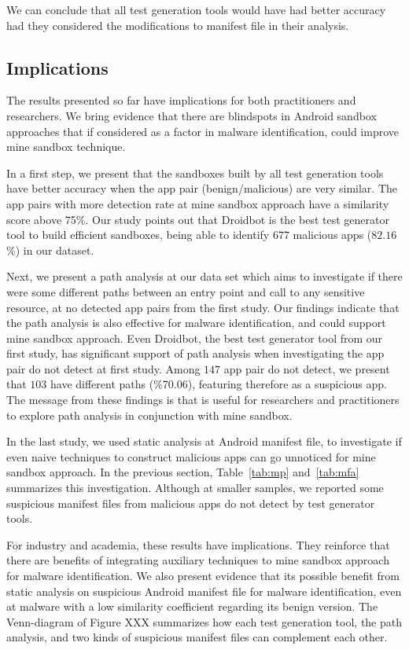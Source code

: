 \begin{obs}{3}{}
 We can conclude that all test generation tools  would have had better accuracy had they considered the modifications to manifest file in their analysis. 
\end{obs}

\subsection{Implications}\label{sec:implications}

The results presented so far have implications for both practitioners and researchers. We bring evidence that there are blindspots in Android sandbox approaches that if considered as a factor in malware identification, could improve mine sandbox technique. 

In a first step, we present that the sandboxes built by all test generation tools have better accuracy when the app pair (benign/malicious) are very similar. The app pairs with more detection rate at mine sandbox approach have a similarity score above 75\%. Our study points out that Droidbot is the best test generator tool to build efficient sandboxes, being able to identify $677$ malicious apps ($82.16$\%) in our dataset.

Next, we present a path analysis at our data set which aims to investigate if there were some different paths between an entry point and call to any sensitive resource, at no detected app pairs from the first study. Our findings indicate that the path analysis is also effective for malware identification, and could support mine sandbox approach. Even Droidbot, the best test generator tool from our first study, has significant support of path analysis when investigating the app pair do not detect at first study. Among $147$ app pair do not detect, we present that $103$ have different paths (\%70.06), featuring therefore as a suspicious app. The message from these findings is that is useful for researchers and practitioners to explore path analysis in conjunction with mine sandbox.

In the last study, we used static analysis at Android manifest file, to investigate if even naive techniques to construct malicious apps can go unnoticed for mine sandbox approach. In the previous section, Table~\ref{tab:mp} and~\ref{tab:mfa} summarizes this investigation. Although at smaller samples, we reported some suspicious manifest files from malicious apps do not detect by test generator tools.

For industry and academia, these results have implications. They reinforce that there are benefits of integrating auxiliary techniques to mine sandbox approach for malware identification. We also present evidence that its possible benefit from static analysis on suspicious Android manifest file for malware identification, even at malware with a low similarity coefficient regarding its benign version. The Venn-diagram of Figure XXX summarizes how each test generation tool, the path analysis, and two kinds of suspicious manifest files can complement each other.
